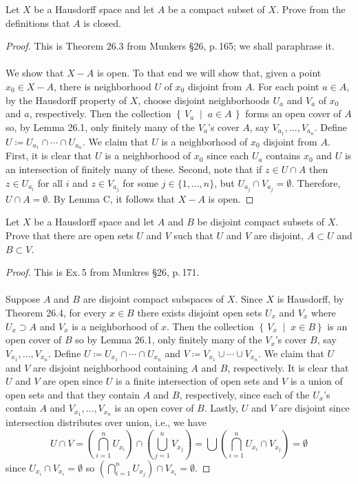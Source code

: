 \begin{problem}
Let $X$ be a Hausdorff space and let $A$ be a compact subset of
$X$. Prove from the definitions that $A$ is closed.
\end{problem}
\begin{proof}
This is Theorem 26.3 from Munkers \S26, p.\,165; we shall paraphrase it.
\\\\
We show that $X-A$ is open. To that end we will show that, given a point
$x_0\in X-A$, there is neighborhood $U$ of $x_0$ disjoint from $A$. For
each point $a\in A$, by the Hausdorff property of $X$, choose disjoint
neighborhoods $U_a$ and $V_a$ of $x_0$ and $a$, respectively. Then the
collection $\left\{\,V_a\;\middle|\;a\in A\,\right\}$ forms an open cover
of $A$ so, by Lemma 26.1, only finitely many of the $V_a$'s cover $A$, say
$V_{a_1},...,V_{a_n}$. Define $U\coloneqq U_{a_1}\cap\cdots\cap
U_{a_n}$. We claim that $U$ is a neighborhood of $x_0$ disjoint from
$A$. First, it is clear that $U$ is a neighborhood of $x_0$ since each
$U_a$ contains $x_0$ and $U$ is an intersection of finitely many of
these. Second, note that if $z\in U\cap A$ then $z\in U_{a_i}$ for all $i$
and $z\in V_{a_j}$ for some $j\in\{1,...,n\}$, but $U_{a_j}\cap
V_{a_j}=\emptyset$. Therefore, $U\cap A=\emptyset$. By Lemma C, it follows
that $X-A$ is open.
\end{proof}
\begin{problem}
Let $X$ be a Hausdorff space and let $A$ and $B$ be disjoint
compact subsets of $X$. Prove that there are open sets $U$ and
$V$ such that $U$ and $V$ are disjoint, $A\subset U$ and
$B\subset V$.
\end{problem}
\begin{proof}
This is Ex.\,5 from Munkres \S26, p.\,171.
\\\\
Suppose $A$ and $B$ are disjoint compact subspaces of $X$. Since $X$ is
Hausdorff, by Theorem 26.4, for every $x\in B$ there exists disjoint open
sets $U_x$ and $V_x$ where $U_x\supset A$ and $V_x$ is a neighborhood of
$x$. Then the collection $\left\{\,V_x\;\middle|\;x\in B\right\}$ is an
open cover of $B$ so by Lemma 26.1, only finitely many of the $V_x$'s cover
$B$, say $V_{x_1},...,V_{x_n}$. Define $U\coloneqq U_{x_1}\cap\cdots\cap
U_{x_n}$ and $V\coloneqq V_{x_1}\cup\cdots\cup V_{x_n}$. We claim that $U$
and $V$ are disjoint neighborhood containing $A$ and $B$, respectively. It
is clear that $U$ and $V$ are open since $U$ is a finite intersection of
open sets and $V$ is a union of open sets and that they contain $A$ and
$B$, respectively, since each of the $U_x$'s contain $A$ and
$V_{x_1},...,V_{x_n}$ is an open cover of $B$. Lastly, $U$ and $V$ are
disjoint since intersection distributes over union, i.e., we have
\[
U\cap V=
\left(\bigcap_{i=1}^nU_{x_i}\right)\cap\left(\bigcup_{j=1}^n
  V_{x_j}\right)=
\bigcup\left(\bigcap_{i=1}^nU_{x_i}\cap V_{x_j}\right)=\emptyset
\]
since $U_{x_i}\cap V_{x_i}=\emptyset$ so
$\left(\bigcap_{i=1}^nU_{x_j}\right)\cap V_{x_i}=\emptyset$.
\end{proof}

